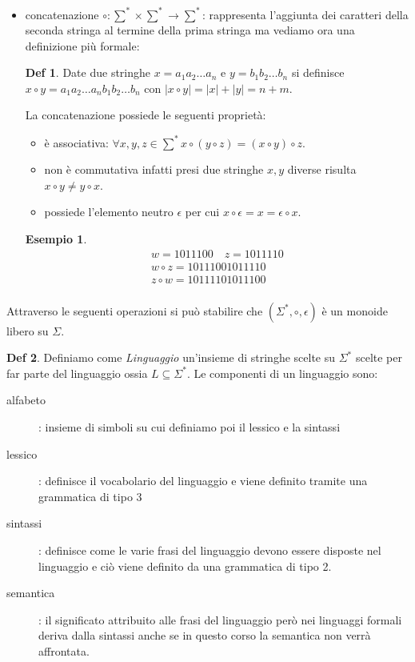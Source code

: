 \documentclass[a4paper]{report}
\theoremstyle{definition}%
\newtheorem*{defi}{Def}%
\newtheorem*{esempio}{Esempio}
\begin{document}
\begin{itemize}
  \item concatenazione $\circ: \sum ^ * \times \sum ^ * \to \sum ^ *$: rappresenta l'aggiunta dei caratteri della seconda stringa
        al termine della prima stringa ma vediamo ora una definizione più formale:
        \begin{defi}
          Date due stringhe $x = a_1 a_2 \dots a_n$ e $y = b_1 b_2 \dots b_n$ si definisce $x \circ y = a_1 a_2 \dots a_n b_1 b_2 \dots b_n$
          con $|x \circ y| = |x| + |y| = n + m$.
        \end{defi}
        La concatenazione possiede le seguenti proprietà:
        \begin{itemize}
        \item è associativa: $\forall x,y,z \in \sum^* x \circ (y \circ z) = (x \circ y) \circ z$.
        \item non è commutativa infatti presi due stringhe $x,y$ diverse risulta $x \circ y \neq y \circ x$.
        \item possiede l'elemento neutro $\epsilon$ per cui $x \circ \epsilon = x = \epsilon \circ x$.
        \end{itemize}
        \begin{esempio}
          \begin{equation*}
          \begin{split}
            w = 1011100 \quad z = 1011110  \\
          w \circ z = 10111001011110 \\
          z \circ w = 10111101011100 \\
          \end{split}
          \end{equation*}
        \end{esempio}
  \end{itemize}
  Attraverso le seguenti operazioni si può stabilire che $(\Sigma ^ *,\circ,\epsilon)$ è un monoide libero su $\Sigma$.

  \begin{defi}
    Definiamo come \emph{Linguaggio} un'insieme di stringhe scelte su $\Sigma ^ *$ scelte per far parte del linguaggio
    ossia $L \subseteq \Sigma ^ *$.
    Le componenti di un linguaggio sono:
    \begin{description}
    \item [alfabeto] : insieme di simboli su cui definiamo poi il lessico e la sintassi
    \item [lessico]: definisce il vocabolario del linguaggio e viene definito tramite una grammatica di tipo 3
    \item [sintassi]: definisce come le varie frasi del linguaggio devono essere disposte nel linguaggio e ciò
      viene definito da una grammatica di tipo 2.
    \item [semantica]: il significato attribuito alle frasi del linguaggio però nei linguaggi formali deriva dalla sintassi
      anche se in questo corso la semantica non verrà affrontata.
    \end{description}
  \end{defi}
\end{document}
